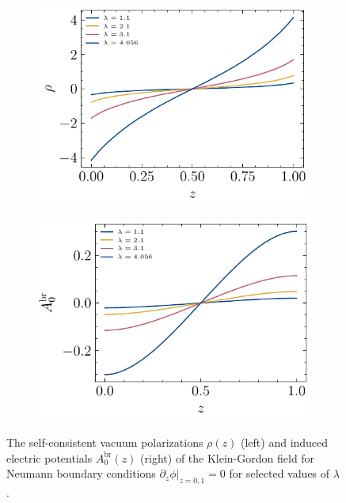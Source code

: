 \begin{figure}
\begin{subfigure}{0.5\textwidth}
    \centering
    \includegraphics[width=\linewidth]{figures/neumann/vacuumPolarizationEvolution.pdf}
\end{subfigure}
\begin{subfigure}{0.5\textwidth}
    \centering
    \includegraphics[width=\linewidth]{figures/neumann/A0InducedEvolution.pdf}
\end{subfigure}
\caption{The self-consistent vacuum polarizations $\rho(z)$ (left) and induced electric potentials $A_0^\text{br}(z)$ (right) of the Klein-Gordon field for Neumann boundary conditions $\partial_z \phi \rvert_{z=0,1}=0$ for selected values of $\lambda$.}
    \label{fig:vacuumPolarizatoinEvolutionNeumann}
\end{figure}

